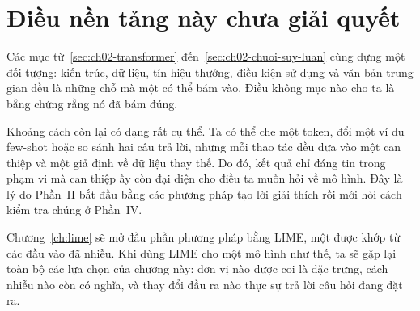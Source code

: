 \section{Điều nền tảng này chưa giải quyết}
\label{sec:ch02-dieu-con-lai}

Các mục từ~\ref{sec:ch02-transformer} đến~\ref{sec:ch02-chuoi-suy-luan} cùng
dựng một đối tượng: kiến trúc, dữ liệu, tín hiệu thưởng, điều kiện sử dụng và
văn bản trung gian đều là những chỗ mà một
 có thể bám vào. Điều không
mục nào cho ta là bằng chứng rằng nó đã bám đúng.

Khoảng cách còn lại có dạng rất cụ thể. Ta có thể che một token, đổi một ví
dụ few-shot hoặc so sánh hai câu trả lời, nhưng mỗi thao tác đều đưa vào một
can thiệp và một giả định về dữ liệu thay thế. Do đó, kết quả chỉ đáng tin
trong phạm vi mà can thiệp ấy còn đại diện cho điều ta muốn hỏi về mô hình.
Đây là lý do Phần~II bắt đầu bằng các phương pháp tạo lời giải thích rồi mới
hỏi cách kiểm tra chúng ở Phần~IV.

Chương~\ref{ch:lime} sẽ mở đầu phần phương pháp bằng LIME, một  được khớp từ các đầu vào đã nhiễu. Khi dùng LIME cho một mô hình như thế, ta sẽ
gặp lại toàn bộ các lựa chọn của chương này: đơn vị nào được coi là đặc trưng,
cách nhiễu  nào còn có nghĩa, và thay đổi đầu ra nào thực sự trả lời
câu hỏi đang đặt ra.
